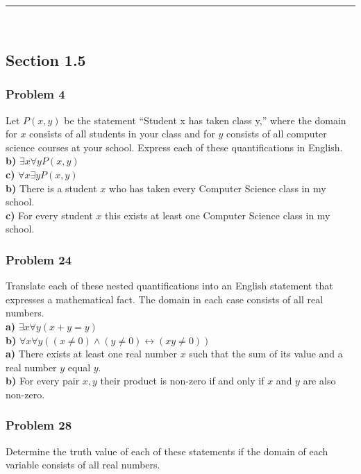 \documentclass[paper=a4, fontsize=11pt]{scrartcl} %
\newcommand{\horrule}[1]{\rule{\linewidth}{#1}} %
\begin{document}
\horrule{0.5pt} \\ %
\subsection*{Section 1.5}
\subsubsection*{Problem 4}

Let $P(x, y)$ be the statement “Student x has taken class
y,” where the domain for $x$ consists of all students in your
class and for $y$ consists of all computer science courses
at your school. Express each of these quantifications in
English.\\

\textbf{b)} $\exists x \forall y P(x, y)$\\
\textbf{c)} $\forall x \exists y P(x, y)$\\

\textbf{b)} There is a student $x$ who has taken every Computer Science class in my school.\\
\textbf{c)} For every student $x$ this exists at least one Computer Science class in my school.

\subsubsection*{Problem 24}

Translate each of these nested quantifications into an English 
statement that expresses a mathematical fact. The
domain in each case consists of all real numbers.\\

\textbf{a)} $\exists x \forall y(x + y = y)$\\
\textbf{b)} $\forall x \forall y((x \ne 0) \land (y \ne 0) \leftrightarrow (xy \ne 0))$\\

\textbf{a)} There exists at least one real number $x$ such that the sum of its value and a real number $y$ equal $y$.\\
\textbf{b)} For every pair $x,y$ their product is non-zero if and only if $x$ and $y$ are also non-zero.

\subsubsection*{Problem 28}

Determine the truth value of each of these statements if
the domain of each variable consists of all real numbers.
\end{document}
